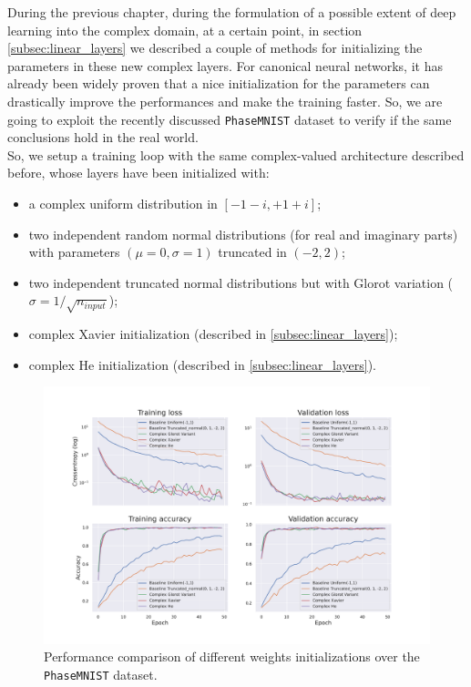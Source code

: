 \documentclass[../main.tex]{subfiles}
\begin{document}
During the previous chapter, during the formulation of a possible extent of deep learning into the complex domain, at a certain point, in section \ref{subsec:linear_layers} we described a couple of methods for initializing the parameters in these new complex layers. For canonical neural networks, it has already been widely proven that a nice initialization for the parameters can drastically improve the performances and make the training faster. So, we are going to exploit the recently discussed \texttt{PhaseMNIST} dataset to verify if the same conclusions hold in the real world.\\
So, we setup a training loop with the same complex-valued architecture described before, whose layers have been initialized with:
\begin{itemize}
	\item a complex uniform distribution in $[-1-i,+1+i]$;
	\item two independent random normal distributions (for real and imaginary parts) with parameters $(\mu=0, \sigma=1)$ truncated in $(-2,2)$;
	\item  two independent truncated normal distributions but with Glorot variation ($\sigma = 1/\sqrt{n_{input}}$);
	\item complex Xavier initialization (described in \ref{subsec:linear_layers});
	\item complex He initialization (described in \ref{subsec:linear_layers}).
\end{itemize}
\begin{figure}[!ht]
	\centering
	\includegraphics[width=\textwidth]{pictures/performance_winit}
	\caption{Performance comparison of different weights initializations over the \texttt{PhaseMNIST} dataset.}
	\label{fig:performance_winit}
\end{figure}
\end{document}
